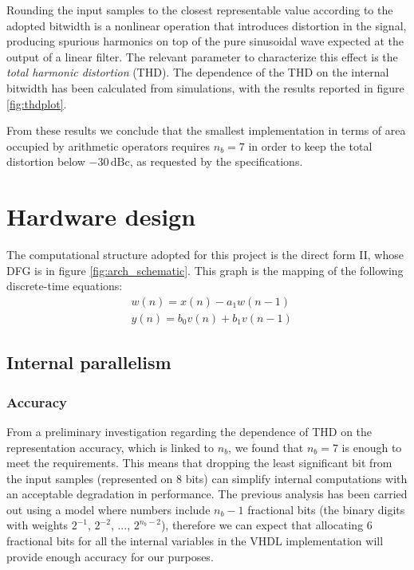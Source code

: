 Rounding the input samples to the closest representable value according to the adopted bitwidth is a nonlinear operation that introduces distortion in the signal, producing spurious harmonics on top of the pure sinusoidal wave expected at the output of a linear filter. The relevant parameter to characterize this effect is the \textit{total harmonic distortion} (THD). The dependence of the THD on the internal bitwidth has been calculated from simulations, with the results reported in figure \ref{fig:thdplot}. 


From these results we conclude that the smallest implementation in terms of area occupied by arithmetic operators requires $n_b=7$ in order to keep the total distortion below $-30\,\textrm{dBc}$, as requested by the specifications.

\section{Hardware design}
The computational structure adopted for this project is the direct form II, whose DFG is in figure \ref{fig:arch_schematic}. This graph is the mapping of the following discrete-time equations:
\begin{align}\label{eqn:iir2}
&w(n) = x(n) - a_1w(n-1)\\
&y(n) = b_0v(n) + b_1v(n-1)
\end{align} 
\subsection{Internal parallelism}
\subsubsection{Accuracy}
From a preliminary investigation regarding the dependence of THD on the representation accuracy, which is linked to $n_b$, we found that $n_b=7$ is enough to meet the requirements. This means that dropping the least significant bit from the input samples (represented on 8 bits) can simplify internal computations with an acceptable degradation in performance. The previous analysis has been carried out using a model where numbers include $n_b-1$ fractional bits (the binary digits with weights $2^{-1}$, $2^{-2}$, ..., $2^{n_b-2}$), therefore we can expect that allocating 6 fractional bits for all the internal variables in the VHDL implementation will provide enough accuracy for our purposes.
